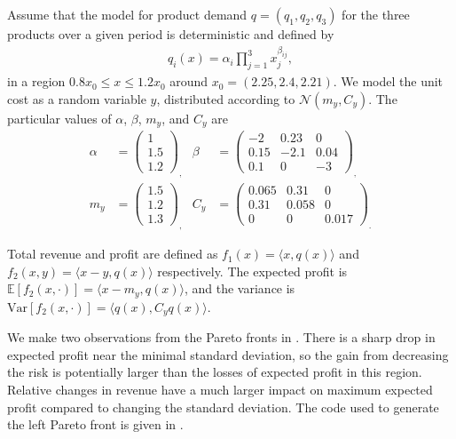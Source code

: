 \documentclass[main.tex]{subfiles}
\begin{document}
\begin{example}
  Assume that the model for product demand $q=(q_1,q_2,q_3)$ for the
  three products over a given period is
  deterministic and defined by
  \begin{align}
    q_i(x) = \alpha_i\prod_{j=1}^3x_j^{\beta_{ij}},
  \end{align}
  in a region $0.8x_0\leq x\leq 1.2x_0$ around $x_0=(2.25,2.4,2.21)$.
  We model the unit cost as a random variable $y$, distributed
  according to $\mathcal{N}(m_y,C_y)$.
  The particular values of $\alpha$, $\beta$, $m_y$, and $C_y$ are
  \begin{align}
    \alpha
    &= \left( \begin{array}{c} 1\\1.5\\1.2
              \end{array}\right)_,
    & \beta
    &= \begin{pmatrix}
      -2 & 0.23 & 0\\
      0.15 &-2.1 &0.04\\
      0.1 &0& -3
    \end{pmatrix}_,\\[0.5em]
    m_y
    &=
      \left( \begin{array}{c} 1.5\\1.2\\1.3
             \end{array}\right)_,
    & C_y
    &= \begin{pmatrix}
      0.065&0.31&0\\
      0.31 & 0.058 &0 \\
      0&0&0.017
    \end{pmatrix}_.
  \end{align}

  Total revenue and profit are defined as
  $f_1(x) = \langle x, q(x)\rangle$ and
  $f_2(x,y)= \langle x-y, q(x) \rangle$ respectively.
  The expected profit is $\mathbb{E}[f_2(x,\cdot)] = \langle x-m_y,
  q(x) \rangle$, and the variance is
  $\mbox{Var}[f_2(x,\cdot)]= \langle q(x), C_y q(x) \rangle$.

  We make two observations from the Pareto fronts in
  .
  There is a sharp drop in expected profit near
  the minimal standard deviation, so the gain from decreasing the risk is
  potentially larger than the losses of expected profit in this region.
  Relative changes in revenue have a much larger impact on maximum expected
  profit compared to changing the standard deviation.
  The code used to generate the left Pareto front is given in
  .
\end{example}
\end{document}
